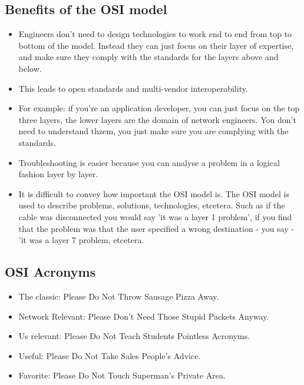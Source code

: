 \subsection{Benefits of the OSI model}
\begin{itemize}
    \item Engineers don't need to design technologies to work end to end from top to bottom of the model. Instead they can just focus on their layer of expertise, and make sure they comply with the standards for the layers above and below.
    \item This leads to open standards and multi-vendor interoperability. 
    \item For example: if you're an application developer, you can just focus on the top three layers, the lower layers are the domain of network engineers. You don't need to understand thzem, you just make sure you are complying with the standards.
    \item Troubleshooting is easier because you can analyse a problem in a logical fashion layer by layer.
    \item It is difficult to convey how important the OSI model is. The OSI model is used to describe problems, solutions, technologies, etcetera. Such as if the cable was disconnected you would say 'it was a layer 1 problem', if you find that the problem was that the user specified a wrong destination - you say - 'it was a layer 7 problem, etcetera.
\end{itemize}

\subsection{OSI Acronyms}
\begin{itemize}
    \item The classic: Please Do Not Throw Sausage Pizza Away.
    \item Network Relevant: Please Don't Need Those Stupid Packets Anyway.
    \item Us relevant: Please Do Not Teach Students Pointless Acronyms.
    \item Useful: Please Do Not Take Sales People's Advice.
    \item Favorite: Please Do Not Touch Superman's Private Area.
\end{itemize}


